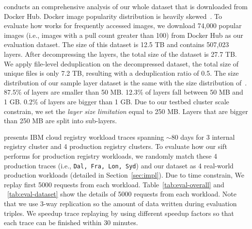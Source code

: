 \cite{xxx} conducts an comprehensive analysis of our whole dataset that is downloaded from Docker Hub. 
Docker image popularity distribution is heavily skewed~\cite{analysisdockergithub}.
To evaluate how \sysname works for frequently accessed images, we download 74,000 popular images (i.e., images with a pull count greater than 100) from Docker Hub as our evaluation dataset. The size of this dataset is 12.5 TB and contains 507,023 layers. 
After decompressing the layers, the total size of the dataset is 27.7 TB.
We apply file-level deduplication on the decompressed dataset, the total size of unique files is only 7.2 TB, resulting with a deduplication ratio of 0.5.
The size distribution of our sample layer dataset is the same with the size distribution of~\cite{analysisdockergithub}.
87.5\% of layers are smaller than 50 MB.
12.3\% of layers fall between 50 MB and 1 GB.
0.2\% of layers are bigger than 1 GB.
Due to our testbed cluster scale constrain, we set the \emph{layer size limitation} equal to 250 MB. 
Layers that are bigger than 250 MB are split into sub-layers.

\cite{dockerworkload} presents IBM cloud registry workload traces 
spanning $\sim$80 days for 3 internal registry cluster and 4 production registry clusters. 
To evaluate how our sift performs for production registry workloads,
we randomly match these 4 production traces (i.e., \texttt{Dal, Fra, Lon, Syd}) and our dataset as 4 real-world production workloads
(detailed in Section~\ref{sec:impl}). 
Due to time constrain,
We replay first 5000 requests from each workload.
Table~\ref{tab:eval-overall} and ~\ref{tab:eval-dataset} show the details of 5000 requests from each workload.
Note that we use 3-way replication
so the amount of data written during evaluation triples.
We speedup trace replaying by using different speedup factors
so that each trace can be finished within 30 minutes.




